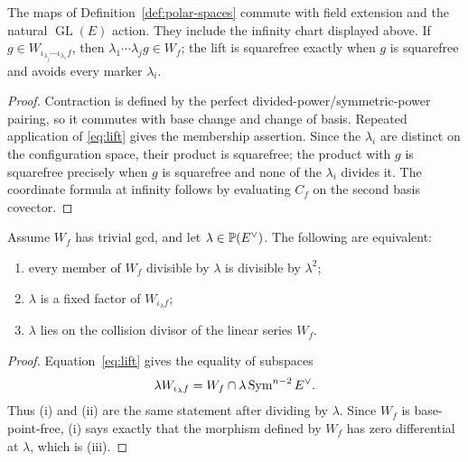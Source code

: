 \begin{theorem}\label{thm:polar-construction}%
%
%
The maps of Definition~\ref{def:polar-spaces} commute with field
extension and the natural $\operatorname{GL}(E)$ action.  They include
the infinity chart displayed above.  If
$g\in W_{\iota_{\lambda_j}\cdots\iota_{\lambda_1}f}$, then
$\lambda_1\cdots\lambda_jg\in W_f$; the lift is squarefree exactly
when $g$ is squarefree and avoids every marker $\lambda_i$.
\end{theorem}

\begin{proof}
Contraction is defined by the perfect divided-power/symmetric-power
pairing, so it commutes with base change and change of basis.  Repeated
application of \eqref{eq:lift} gives the membership assertion.  Since
the $\lambda_i$ are distinct on the configuration space, their product
is squarefree; the product with $g$ is squarefree precisely when $g$
is squarefree and none of the $\lambda_i$ divides it.  The coordinate
formula at infinity follows by evaluating $C_f$ on the second basis
covector.
\end{proof}

\begin{lemma}
\label{lem:marker-collision}%
%
Assume \(W_f\) has trivial gcd, and let \(\lambda\in\mathbb P(E^\vee)\).
The following are equivalent:
\begin{enumerate}[label=\textup{(\roman*)}]
\item every member of \(W_f\) divisible by \(\lambda\) is divisible
  by \(\lambda^2\);
\item \(\lambda\) is a fixed factor of \(W_{\iota_\lambda f}\);
\item \(\lambda\) lies on the collision divisor of the linear series
  \(W_f\).
\end{enumerate}
\end{lemma}

\begin{proof}
Equation~\eqref{eq:lift} gives the equality of subspaces
\[
 \lambda W_{\iota_\lambda f}
 =W_f\cap\lambda\operatorname{Sym}^{n-2}E^\vee.
\]
Thus (i) and (ii) are the same statement after dividing by
\(\lambda\).  Since \(W_f\) is base-point-free, (i) says exactly that
the morphism defined by \(W_f\) has zero differential at \(\lambda\),
which is (iii).
\end{proof}

